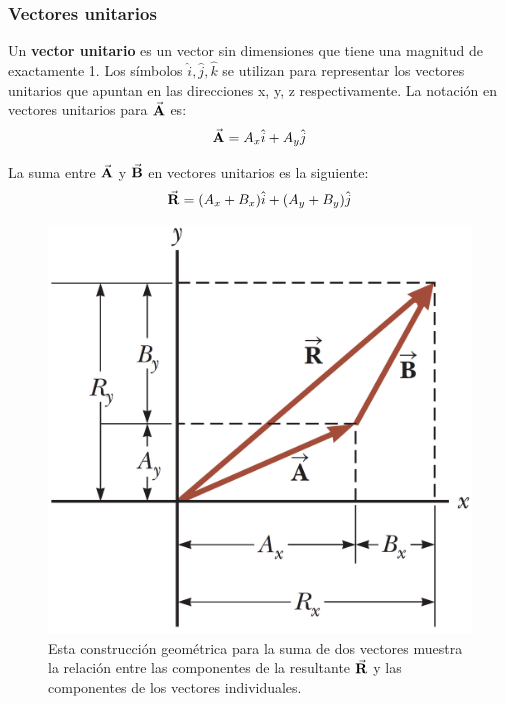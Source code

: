     \subsubsection{Vectores unitarios}
      \PN Un \textbf{vector unitario} es un vector sin dimensiones que tiene una magnitud de exactamente 1. Los símbolos
      $\hat{i}, \hat{j}, \hat{k}$ se utilizan para representar los vectores unitarios que apuntan en las direcciones
      x, y, z respectivamente. La notación en vectores unitarios para $\vec{\mathbf{A}}$ es:
      \[
        \vec{\mathbf{A}} = A_{x} \hat{i} + A_{y} \hat{j}
      \]

      \PN La suma entre $\vec{\mathbf{A}}$ y $\vec{\mathbf{B}}$ en vectores unitarios es la siguiente:
      \[
        \vec{\mathbf{R}} = (A_{x} + B_{x}) \hat{i} + (A_{y} + B_{y}) \hat{j}
      \]

      \begin{figure}[H]
        \centering
        \includegraphics[scale=0.25]{1/graphics_3/figure_4}
        \caption{Esta construcción geométrica para la suma de dos vectores muestra la relación entre las componentes de
        la resultante $\vec{\mathbf{R}}$ y las componentes de los vectores individuales.}
      \end{figure}
